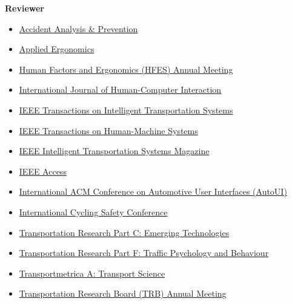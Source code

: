 \documentclass[11pt]{article}
\newenvironment{main}
{\begin{adjustwidth}{3em}{}}
{\end{adjustwidth}}
\begin{document}
\begin{main}
\textbf{Reviewer}
\begin{itemize}
    \item \href{https://www.journals.elsevier.com/accident-analysis-and-prevention}{Accident Analysis \& Prevention}
    \item \href{https://www.journals.elsevier.com/applied-ergonomics}{Applied Ergonomics}
    \item \href{www.hfes.org}{Human Factors and Ergonomics (HFES) Annual Meeting}
    \item \href{https://www.tandfonline.com/toc/hihc20/current}{International Journal of Human-Computer Interaction}
    \item \href{https://ieeexplore.ieee.org/xpl/RecentIssue.jsp?punumber=6979}{IEEE Transactions on Intelligent Transportation Systems}
    \item \href{https://ieeexplore.ieee.org/xpl/RecentIssue.jsp?punumber=6221037}{IEEE Transactions on Human-Machine Systems}
    \item \href{https://ieeexplore.ieee.org/xpl/RecentIssue.jsp?punumber=5117645}{IEEE Intelligent Transportation Systems Magazine}
    \item \href{https://ieeexplore.ieee.org/xpl/RecentIssue.jsp?punumber=6287639}{IEEE Access}
    \item \href{www.auto-ui.org}{International ACM Conference on Automotive User Interfaces (AutoUI)}
    \item \href{www.cyclingsafety.net}{International Cycling Safety Conference}
    \item \href{https://www.journals.elsevier.com/transportation-research-part-c-emerging-technologies}{Transportation Research Part C: Emerging Technologies}
    \item \href{https://www.journals.elsevier.com/transportation-research-part-f-traffic-psychology-and-behaviour}{Transportation Research Part F: Traffic Psychology and Behaviour}
    \item \href{https://www.tandfonline.com/toc/ttra21/current}{Transportmetrica A: Transport Science}
    \item \href{http://www.trb.org/AnnualMeeting/}{Transportation Research Board (TRB) Annual Meeting}
\end{itemize}



\end{main}
\end{document}
